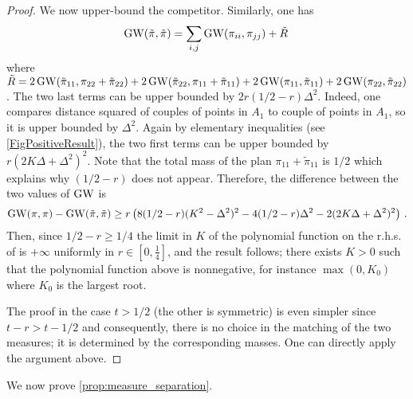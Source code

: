\begin{proof}
            We now upper-bound the competitor. Similarly, one has
            \begin{equation*}
             \operatorname{GW}(\tilde\pi,\tilde\pi)  = \sum_{i,j} \operatorname{GW}(\pi_{ii},\pi_{jj}) + \tilde R\,
            \end{equation*}
            where $\tilde R = 2\operatorname{GW}(\tilde \pi_{11},\pi_{22} + \tilde \pi_{22}) +2 \operatorname{GW}(\tilde \pi_{22},\pi_{11} + \tilde \pi_{11}) + 2\operatorname{GW}(\pi_{11},\tilde \pi_{11}) + 2\operatorname{GW}(\pi_{22},\tilde \pi_{22})$. The two last terms can be upper bounded by $2r(1/2-r) \Delta^2$.
            Indeed, one compares distance squared of couples of points in $A_1$ to couple of points in $A_1$, so it is upper bounded by $\Delta^2$.
            Again by elementary inequalities (see \cref{FigPositiveResult}), the two first terms can be upper bounded by $r(2K\Delta + \Delta^2)^2$. Note that the total mass of the plan $\pi_{11} + \tilde \pi_{11}$ is $1/2$ which explains why $(1/2-r)$ does not appear.
            Therefore, the difference between the two values of $\operatorname{GW}$ is
            \begin{equation}\label{EqComparison}
                \operatorname{GW}(\pi,\pi) - \operatorname{GW}(\tilde \pi,\tilde \pi) \geq r\left(8 (1/2-r)(K^2 - \Delta^2)^2 - 4 (1/2-r) \Delta^2  - 2(2K\Delta + \Delta^2)^2\right)\,.
            \end{equation}
            Then, since $1/2 - r\geq 1/4$ the limit in $K$ of the polynomial function on the r.h.s. of  is $+\infty$ uniformly in $r\in [0,\frac 14]$, and the result follows; there exists $K>0$ such that the polynomial function above is nonnegative, for instance $\max(0,K_0)$ where $K_0$ is the largest root.

            The proof in the case $t > 1/2$ (the other is symmetric) is even simpler since $t- r > t-1/2$ and consequently, there is no choice in the matching of the two measures; it is determined by the corresponding masses. One can directly apply the argument above. \qedhere
            \end{proof}

            \noindent We now prove \cref{prop:measure_separation}.

